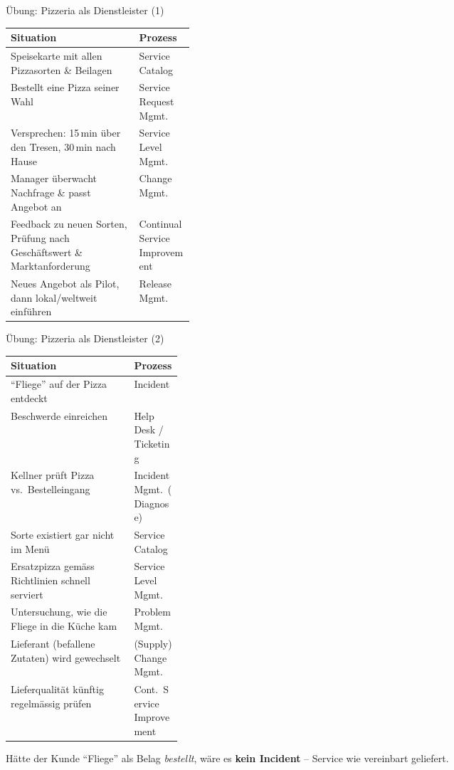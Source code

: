 \documentclass[a4paper, fontsize=7pt]{scrartcl}
\renewcommand*{\arraystretch}{1.5}  %
\begin{document}
\begin{subbox}{Übung: Pizzeria als Dienstleister (1)}
\renewcommand*{\arraystretch}{1.15}
\begin{tabularx}{\linewidth}{@{}>{\raggedright\arraybackslash}X|>{\raggedright\arraybackslash}p{0.3\linewidth}@{}}
\textbf{Situation} & \textbf{Prozess} \\
\hline
Speisekarte mit allen Pizzasorten \& Beilagen & Service Catalog \\
Bestellt eine Pizza seiner Wahl & Service Request Mgmt. \\
Versprechen: 15\,min über den Tresen, 30\,min nach Hause & Service Level
  Mgmt. \\
Manager überwacht Nachfrage \& passt Angebot an & Change Mgmt. \\
Feedback zu neuen Sorten, Prüfung nach Geschäftswert \& Marktanforderung &
  Continual Service Improvement \\
Neues Angebot als Pilot, dann lokal/weltweit einführen & Release Mgmt. \\
\end{tabularx}
\end{subbox}

\begin{subbox}{Übung: Pizzeria als Dienstleister (2)}
\renewcommand*{\arraystretch}{1.15}
\begin{tabularx}{\linewidth}{@{}>{\raggedright\arraybackslash}X|>{\raggedright\arraybackslash}p{0.28\linewidth}@{}}
\textbf{Situation} & \textbf{Prozess} \\
\hline
``Fliege'' auf der Pizza entdeckt & Incident \\
Beschwerde einreichen & Help Desk / Ticketing \\
Kellner prüft Pizza vs.\ Bestelleingang & Incident Mgmt.\ (Diagnose) \\
Sorte existiert gar nicht im Menü & Service Catalog \\
Ersatzpizza gemäss Richtlinien schnell serviert & Service Level Mgmt. \\
Untersuchung, wie die Fliege in die Küche kam & Problem Mgmt. \\
Lieferant (befallene Zutaten) wird gewechselt & (Supply) Change Mgmt. \\
Lieferqualität künftig regelmässig prüfen & Cont.\ Service Improvement \\
\end{tabularx}
Hätte der Kunde ``Fliege'' als Belag \emph{bestellt}, wäre es \textbf{kein
Incident} -- Service wie vereinbart geliefert.
\end{subbox}
\end{document}
